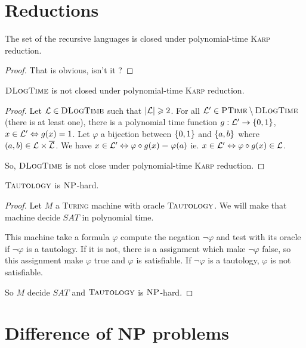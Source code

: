 \section{Reductions}
\begin{propo}
    The set of the recursive languages is closed under polynomial-time \textsc{Karp} reduction.
\end{propo}
\begin{proof}
    That is obvious, isn't it ?
\end{proof}
\begin{propo}
    $\textsc{DLogTime}$ is not closed under polynomial-time \textsc{Karp} reduction.
\end{propo}
\begin{proof}
    Let $\mathcal{L} \in \textsc{DLogTime}$ such that $\lvert \mathcal{L} \rvert \geqslant 2$. For all $\mathcal{L}' \in \textsc{PTime}\setminus\textsc{DLogTime}$ (there is at least one), there is a polynomial time function $g:\mathcal{L}' \to \left\{ 0,1 \right\}$, $x\in\mathcal{L}' \Leftrightarrow g(x) = 1$. Let $\varphi$ a bijection between $\left\{ 0,1 \right\}$ and $\left\{ a,b \right\}$ where $(a,b)\in\mathcal{L}\times\overline{\mathcal{L}}$. We have $x\in\mathcal{L}' \Leftrightarrow \varphi\circ g(x) = \varphi(a)$ ie. $x\in\mathcal{L}' \Leftrightarrow \varphi\circ g(x)\in\mathcal{L}$.
    
    So, $\textsc{DLogTime}$ is not close under polynomial-time \textsc{Karp} reduction.
\end{proof}

\begin{propo}
    $\textsc{Tautology}$ is $\textsc{NP}$-hard.
\end{propo}
\begin{proof}
    Let $M$ a \textsc{Turing} machine with oracle $\textsc{Tautology}$. We will make that machine decide $SAT$ in polynomial time.
    
    This machine take a formula $\varphi$ compute the negation $\neg\varphi$ and test with its oracle if $\neg\varphi$ is a tautology. If it is not, there is a assignment which make $\neg\varphi$ false, so this assignment make $\varphi$ true and $\varphi$ is satisfiable. If $\neg\varphi$ is a tautology, $\varphi$ is not satisfiable.

    So $M$ decide $SAT$ and $\textsc{Tautology}$ is $\textsc{NP}$-hard.
\end{proof}

\section{Difference of NP problems}


